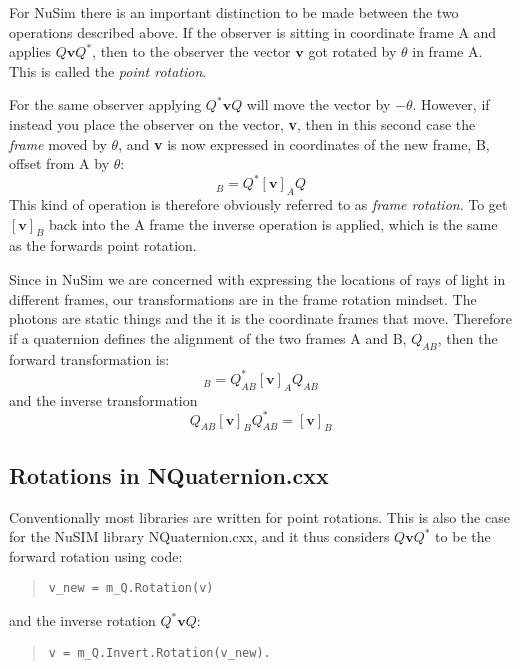 \documentclass[11pt]{article}
\begin{document}
For NuSim there is an important distinction to be made between the two operations described above. If the observer is sitting in coordinate frame A and applies $Q\mathbf{v}Q^*$, then to the observer the vector $\mathbf{v}$ got rotated by $\theta$ in frame A. This is called the \textit{point rotation}. 

For the same observer applying $Q^*\mathbf{v}Q$ will move the vector by $-\theta$. However, if instead you place the observer on the vector, \textbf{v}, then in this second case the \textit{frame} moved by $\theta$, and \textbf{v} is now expressed in coordinates of the new frame, B, offset from A by $\theta$:
\begin{equation}
[\mathbf{v}]_B = Q^*[\mathbf{v}]_AQ
\end{equation}
This kind of operation is therefore obviously referred to as \textit{frame rotation}. To get $[\mathbf{v}]_B$ back into the A frame the inverse operation is applied, which is the same as the forwards point rotation.

Since in NuSim we are concerned with expressing the locations of rays of light in different frames, our transformations are in the frame rotation mindset.  The photons are static things and the it is the coordinate frames that move. Therefore if a quaternion defines the alignment of the two frames A and B, $Q_{AB}$, then the forward transformation is:
\begin{equation}
[\mathbf{v}]_B = Q_{AB}^*[\mathbf{v}]_AQ_{AB}
\end{equation}
and the inverse transformation
\begin{equation}
Q_{AB}[\mathbf{v}]_BQ_{AB}^* = [\mathbf{v}]_B 
\end{equation}

\subsection{Rotations in NQuaternion.cxx}

Conventionally most libraries are written for point rotations. This is also the case for the NuSIM library NQuaternion.cxx, and it thus considers $Q\mathbf{v}Q^*$ to be the forward rotation using code:
\begin{quotation}
\begin{verbatim}
v_new = m_Q.Rotation(v)
\end{verbatim}
\end{quotation}
and the inverse rotation $Q^*\mathbf{v}Q$:  
\begin{quotation}
\begin{verbatim}
v = m_Q.Invert.Rotation(v_new).
\end{verbatim}
\end{quotation}
\end{document}

